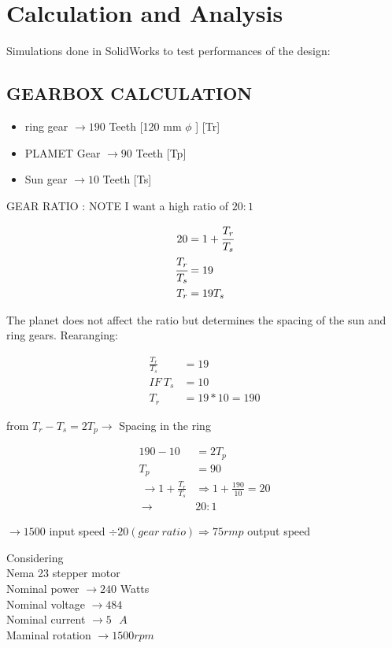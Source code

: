 \documentclass[../../main]{subfiles}
\begin{document}
\section{Calculation and Analysis}

Simulations done in SolidWorks to test performances of the design:


\subsection{GEARBOX CALCULATION}


\begin{itemize}
\item
  ring gear \(\rightarrow 190\) Teeth {[}120 mm \(\phi\) {]} {[}Tr{]}
\item
  PLAMET Gear \(\rightarrow 90\) Teeth {[}Tp{]}
\item
  Sun gear \(\rightarrow 10\) Teeth {[}Ts{]}
\end{itemize}

GEAR RATIO : NOTE I want a high ratio of $20:1$

\[\begin{aligned}
  20 &= 1 + \cfrac{T_{r}}{T_{s}} \\
  \cfrac{T_{r}}{T_{s}} &= 19 \\
  T_{r} &= 19T_{s}
\end{aligned}\]

The planet does not affect the ratio but determines the spacing of the
sun and ring gears.
Rearanging:

\[\begin{aligned}
\frac{T_{r}}{T_{s}} &= 19 \\
IF\ T_{s} &= 10 \\
T_{r} &= 19*10 = 190
\end{aligned}\]

from \(T_{r} - T_{s} = 2T_{p} \rightarrow\) Spacing in the ring

\[\begin{aligned}
190 - 10 &= 2T_{p} \\
T_{p} &= 90 \\
\ \to 1 + \frac{T_{r}}{T_{s}} &\Rightarrow 1 + \frac{190}{10} = 20 \\
\ \to &20:1
\end{aligned}\]

\(\to 1500\) input speed
\(\div 20(gear\ ratio) \Rightarrow 75rmp\) output speed

Considering\\
Nema 23 stepper motor\\
Nominal power \(\rightarrow 240\) Watts\\
Nominal voltage \(\rightarrow 484\)\\
Nominal current \(\rightarrow 5\text{ }A\)\\
Maminal rotation \(\rightarrow 1500rpm\)
\end{document}
